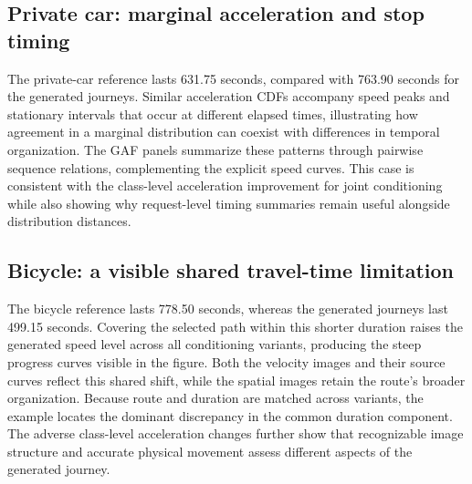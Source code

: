 \subsection{Private car: marginal acceleration and stop timing}
The private-car reference lasts 631.75 seconds, compared with 763.90 seconds for the generated journeys. Similar acceleration CDFs accompany speed peaks and stationary intervals that occur at different elapsed times, illustrating how agreement in a marginal distribution can coexist with differences in temporal organization. The GAF panels summarize these patterns through pairwise sequence relations, complementing the explicit speed curves. This case is consistent with the class-level acceleration improvement for joint conditioning while also showing why request-level timing summaries remain useful alongside distribution distances.
\FloatBarrier

\subsection{Bicycle: a visible shared travel-time limitation}
The bicycle reference lasts 778.50 seconds, whereas the generated journeys last 499.15 seconds. Covering the selected path within this shorter duration raises the generated speed level across all conditioning variants, producing the steep progress curves visible in the figure. Both the velocity images and their source curves reflect this shared shift, while the spatial images retain the route's broader organization. Because route and duration are matched across variants, the example locates the dominant discrepancy in the common duration component. The adverse class-level acceleration changes further show that recognizable image structure and accurate physical movement assess different aspects of the generated journey.
\FloatBarrier

